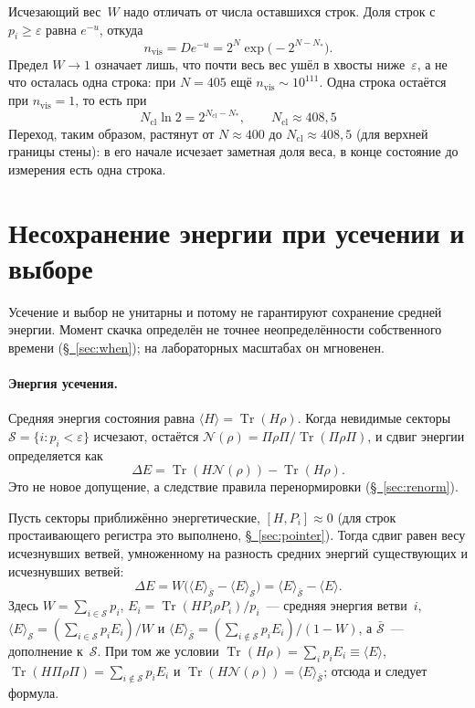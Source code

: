 \documentclass[11pt,a4paper]{article}
\DeclareMathOperator{\Tr}{Tr}
\newcommand{\Ncl}{N_{\mathrm{cl}}}
\newcommand{\Sinv}{\mathcal{S}}
\begin{document}
Исчезающий вес~$W$ надо отличать от числа оставшихся строк. Доля строк с $p_i\ge\varepsilon$ равна $e^{-u}$, откуда
\begin{equation}
n_{\mathrm{vis}} = D e^{-u} = 2^N \exp\bigl(-2^{N-N_*}\bigr).
\end{equation}
Предел $W\to1$ означает лишь, что почти весь вес ушёл в хвосты ниже~$\varepsilon$, а не что осталась одна строка: при $N=405$ ещё $n_{\mathrm{vis}}\sim10^{111}$. Одна строка остаётся при $n_{\mathrm{vis}}=1$, то есть при
\begin{equation}
\Ncl\ln2 = 2^{\Ncl-N_*},
\qquad
\Ncl\approx408{,}5
\end{equation}
Переход, таким образом, растянут от $N\approx400$ до $\Ncl\approx408{,}5$ (для верхней границы стены): в его начале исчезает заметная доля веса, в конце состояние до измерения есть одна строка.

\section{Несохранение энергии при усечении и выборе}
\label{sec:collapse-duration}

Усечение и выбор не унитарны и потому не гарантируют сохранение средней энергии. Момент скачка определён не точнее неопределённости собственного времени (\hyperref[sec:when]{\S~\ref*{sec:when}}); на лабораторных масштабах он мгновенен.

\paragraph{Энергия усечения.}
Средняя энергия состояния равна $\langle H\rangle=\Tr(H\rho)$. Когда невидимые секторы $\Sinv=\{i:p_i<\varepsilon\}$ исчезают, остаётся $\mathcal{N}(\rho)=\Pi\rho \Pi/\Tr(\Pi\rho \Pi)$, и сдвиг энергии определяется как
\begin{equation}
\Delta E=\Tr(H\mathcal{N}(\rho))-\Tr(H\rho).
\end{equation}
Это не новое допущение, а следствие правила перенормировки (\hyperref[sec:renorm]{\S~\ref*{sec:renorm}}).

Пусть секторы приближённо энергетические, $[H,P_i]\approx0$ (для строк простаивающего регистра это выполнено, \hyperref[sec:pointer]{\S~\ref*{sec:pointer}}). Тогда сдвиг равен весу исчезнувших ветвей, умноженному на разность средних энергий существующих и исчезнувших ветвей:
\begin{equation}
\label{eq:branch-energy}
\Delta E=W\bigl(\langle E\rangle_{\bar{\Sinv}}-\langle E\rangle_{\Sinv}\bigr)=\langle E\rangle_{\bar{\Sinv}}-\langle E\rangle.
\end{equation}
Здесь $W=\sum_{i\in \Sinv}p_i$, $E_i=\Tr(HP_i\rho P_i)/p_i$~--- средняя энергия ветви~$i$, $\langle E\rangle_{\Sinv}=(\sum_{i\in \Sinv}p_i E_i)/W$ и $\langle E\rangle_{\bar{\Sinv}}=(\sum_{i\notin \Sinv}p_i E_i)/(1-W)$, а $\bar{\Sinv}$~--- дополнение к~$\Sinv$. При том же условии $\Tr(H\rho)=\sum_i p_i E_i\equiv\langle E\rangle$, $\Tr(H\Pi\rho\Pi)=\sum_{i\notin \Sinv}p_i E_i$ и $\Tr(H\mathcal{N}(\rho))=\langle E\rangle_{\bar{\Sinv}}$; отсюда и следует формула.
\end{document}
